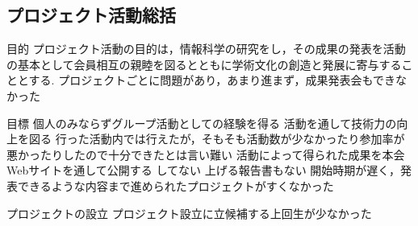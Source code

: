 \subsection*{プロジェクト活動総括}


目的
プロジェクト活動の目的は，情報科学の研究をし，その成果の発表を活動の基本として会員相互の親睦を図るとともに学術文化の創造と発展に寄与することとする.
    プロジェクトごとに問題があり，あまり進まず，成果発表会もできなかった

目標
個人のみならずグループ活動としての経験を得る
活動を通して技術力の向上を図る
    行った活動内では行えたが，そもそも活動数が少なかったり参加率が悪かったりしたので十分できたとは言い難い
活動によって得られた成果を本会Webサイトを通して公開する
    してない
    上げる報告書もない
    開始時期が遅く，発表できるような内容まで進められたプロジェクトがすくなかった

プロジェクトの設立
    プロジェクト設立に立候補する上回生が少なかった
